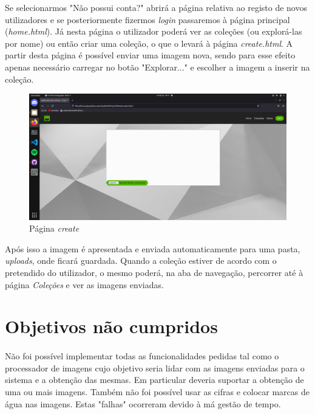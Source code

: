 \documentclass[a4paper, 11pt, oneside]{report}
\begin{document}
\indent Se selecionarmos "Não possui conta?" abrirá a página relativa ao registo de novos utilizadores e se posteriormente fizermos \textit{login} passaremos à página principal (\textit{home.html}). Já nesta página o utilizador poderá ver as coleções (ou explorá-las por nome) ou então criar uma coleção, o que o levará à página \textit{create.html}. A partir desta página é possível enviar uma imagem nova, sendo para esse efeito apenas necessário carregar no botão "Explorar..." e escolher a imagem a inserir na coleção.

\newpage

\begin{figure}[h]
\center
\includegraphics[width=320pt]{createPAGE.png}
\caption{Página \textit{create}}
\end{figure}

\indent Após isso a imagem é apresentada e enviada automaticamente para uma pasta, \textit{uploads}, onde ficará guardada. Quando a coleção estiver de acordo com o pretendido do utilizador, o mesmo poderá, na aba de navegação, percorrer até à página \textit{Coleções} e ver as imagens enviadas.

\section{Objetivos não cumpridos}

\paragraph{} Não foi possível implementar todas as funcionalidades pedidas tal como o processador de imagens cujo objetivo seria lidar com as imagens enviadas para o sistema e a obtenção das mesmas. Em particular deveria suportar a obtenção de uma ou mais imagens. Também não foi possível usar as cifras e colocar marcas de água nas imagens. Estas "falhas" ocorreram devido à má gestão de tempo.

\clearpage
\end{document}
